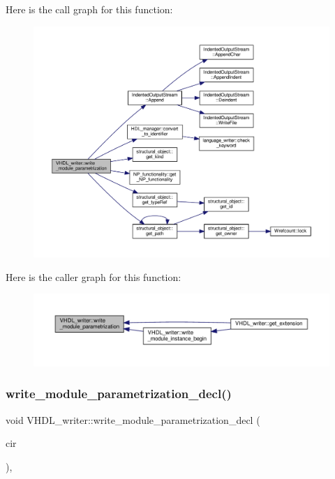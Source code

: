 Here is the call graph for this function\+:
\nopagebreak
\begin{figure}[H]
\begin{center}
\leavevmode
\includegraphics[width=350pt]{d0/d0c/structVHDL__writer_ad9ae71cdd9eefe75ccaffac7aad2c909_cgraph}
\end{center}
\end{figure}
Here is the caller graph for this function\+:
\nopagebreak
\begin{figure}[H]
\begin{center}
\leavevmode
\includegraphics[width=350pt]{d0/d0c/structVHDL__writer_ad9ae71cdd9eefe75ccaffac7aad2c909_icgraph}
\end{center}
\end{figure}
\mbox{\label{structVHDL__writer_a0c54febb526f68c5d71314576086ec3b}} 
\subsubsection{\texorpdfstring{write\+\_\+module\+\_\+parametrization\+\_\+decl()}{write\_module\_parametrization\_decl()}}
{\footnotesize\ttfamily void V\+H\+D\+L\+\_\+writer\+::write\+\_\+module\+\_\+parametrization\+\_\+decl (\begin{DoxyParamCaption}\item[{const \hyperlink{structural__objects_8hpp_a8ea5f8cc50ab8f4c31e2751074ff60b2}{structural\+\_\+object\+Ref} \&}]{cir }\end{DoxyParamCaption})\hspace{0.3cm}{\ttfamily [override]}, {\ttfamily [virtual]}}



